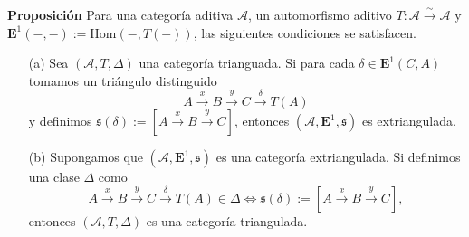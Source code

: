 \documentclass[preview]{standalone}
\begin{document}
\begin{center}
\justifying \textbf{Proposición} Para una categoría aditiva $\mathscr{A}$, un automorfismo aditivo $T:\mathscr{A}\xrightarrow{\sim}\mathscr{A}$ y $\mathbf{E}^1(-,-):=\text{Hom}(-,T(-))$, las siguientes condiciones se satisfacen. \begin{itemize} \item[(a)] Sea $(\mathscr{A}, T, \Delta)$ una categoría trianguada. Si para cada $\delta\in\mathbf{E}^1(C,A)$ tomamos un triángulo distinguido $$A\xrightarrow{x} B\xrightarrow{y} C\xrightarrow{\delta} T(A)$$ y definimos $\mathfrak{s}(\delta):=[A\xrightarrow{x} B\xrightarrow{y} C]$, entonces $(\mathscr{A}, \mathbf{E}^1, \mathfrak{s})$ es extriangulada. \item[(b)] Supongamos que $(\mathscr{A}, \mathbf{E}^1, \mathfrak{s})$ es una categoría extriangulada. Si definimos una clase $\Delta$ como $$A\xrightarrow{x} B\xrightarrow{y} C\xrightarrow{\delta} T(A)\in\Delta \Leftrightarrow \mathfrak{s}(\delta) := [A\xrightarrow{x} B\xrightarrow{y} C],$$ entonces $(\mathscr{A}, T, \Delta)$ es una categoría triangulada. \end{itemize}
\end{center}
\end{document}
